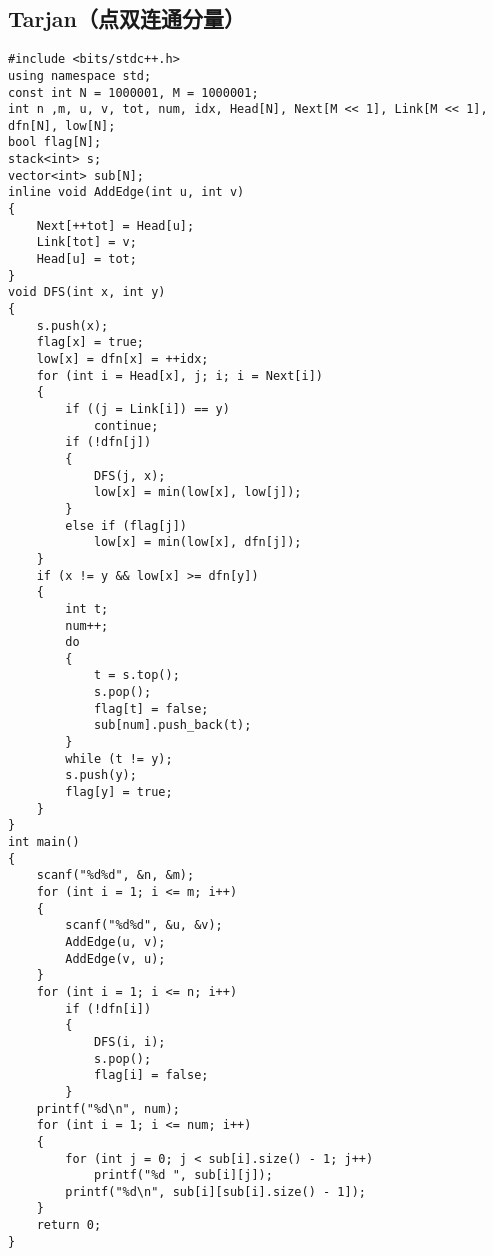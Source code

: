 \documentclass[a4paper]{article}
\begin{document}
\subsection{Tarjan（点双连通分量）}
\begin{lstlisting}
#include <bits/stdc++.h>
using namespace std;
const int N = 1000001, M = 1000001;
int n ,m, u, v, tot, num, idx, Head[N], Next[M << 1], Link[M << 1], dfn[N], low[N];
bool flag[N];
stack<int> s;
vector<int> sub[N];
inline void AddEdge(int u, int v)
{
    Next[++tot] = Head[u];
    Link[tot] = v;
    Head[u] = tot;
}
void DFS(int x, int y)
{
    s.push(x);
    flag[x] = true;
    low[x] = dfn[x] = ++idx;
    for (int i = Head[x], j; i; i = Next[i])
    {
        if ((j = Link[i]) == y)
            continue;
        if (!dfn[j])
        {
            DFS(j, x);
            low[x] = min(low[x], low[j]);
        }
        else if (flag[j])
            low[x] = min(low[x], dfn[j]);
    }
    if (x != y && low[x] >= dfn[y])
    {
        int t;
        num++;
        do
        {
            t = s.top();
            s.pop();
            flag[t] = false;
            sub[num].push_back(t);
        }
        while (t != y);
        s.push(y);
        flag[y] = true;
    }
}
int main()
{
    scanf("%d%d", &n, &m);
    for (int i = 1; i <= m; i++)
    {
        scanf("%d%d", &u, &v);
        AddEdge(u, v);
        AddEdge(v, u);
    }
    for (int i = 1; i <= n; i++)
        if (!dfn[i])
        {
            DFS(i, i);
            s.pop();
            flag[i] = false;
        }
    printf("%d\n", num);
    for (int i = 1; i <= num; i++)
    {
        for (int j = 0; j < sub[i].size() - 1; j++)
            printf("%d ", sub[i][j]);
        printf("%d\n", sub[i][sub[i].size() - 1]);
    }
    return 0;
}
\end{lstlisting}
\end{document}
